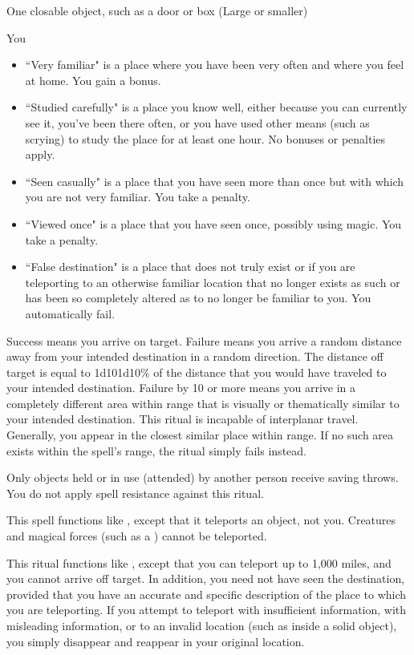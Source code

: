 \begin{spelltarget}{One closable object, such as a door or box (Large or smaller)}
\begin{spelltarget}{You}
\begin{itemize}
    \item ``Very familiar" is a place where you have been very often and where you feel at home. You gain a  bonus.
    \item ``Studied carefully" is a place you know well, either because you can currently see it, you've been there often, or you have used other means (such as scrying) to study the place for at least one hour. No bonuses or penalties apply.
    \item ``Seen casually" is a place that you have seen more than once but with which you are not very familiar. You take a  penalty.
    \item ``Viewed once" is a place that you have seen once, possibly using magic. You take a  penalty.
    \item ``False destination" is a place that does not truly exist or if you are teleporting to an otherwise familiar location that no longer exists as such or has been so completely altered as to no longer be familiar to you. You automatically fail.
\end{itemize}

Success means you arrive on target. Failure means you arrive a random distance away from your intended destination in a random direction. The distance off target is equal to 1d10\mult1d10\% of the distance that you would have traveled to your intended destination. Failure by 10 or more means you arrive in a completely different area within range that is visually or thematically similar to your intended destination.
\spellnotes This ritual is incapable of interplanar travel. Generally, you appear in the closest similar place within range. If no such area exists within the spell's range, the ritual simply fails instead.

Only objects held or in use (attended) by another person receive saving throws. You do not apply spell resistance against this ritual. 

\spelleffect This spell functions like , except that it teleports an object, not you. Creatures and magical forces (such as a ) cannot be teleported.

\spelleffect This ritual functions like , except that you can teleport up to 1,000 miles, and you cannot arrive off target. In addition, you need not have seen the destination, provided that you have an accurate and specific description of the place to which you are teleporting. If you attempt to teleport with insufficient information, with misleading information, or to an invalid location (such as inside a solid object), you simply disappear and reappear in your original location.


\end{spelltarget}
\end{spelltarget}
